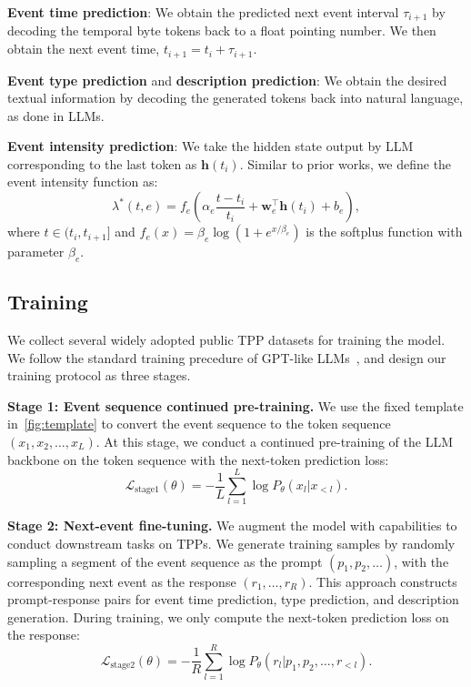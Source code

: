 \textbf{Event time prediction}: We obtain the predicted next event interval $\tau_{i+1}$ by decoding the temporal byte tokens back to a float pointing number. We then obtain the next event time, $t_{i+1} = t_i + \tau_{i+1}$. 

\textbf{Event type prediction} and \textbf{description prediction}: 
    We obtain the desired textual information by decoding the generated tokens back into natural language, as done in LLMs. 

\textbf{Event intensity prediction}: We take the hidden state output by LLM corresponding to the last token as \(\mathbf{h}(t_i)\). Similar to prior works, we define the event intensity function as: 
    \begin{equation}
        \lambda^*(t,e) = f_e(\alpha_e \frac{t-t_i}{t_i} + \mathbf{w}_e^\top \mathbf{h}(t_i) + b_e), 
    \end{equation}
    where $t \in (t_i, t_{i+1}]$ and $f_e(x)=\beta_e \log (1 + e^{x/\beta_e})$ is the softplus function with parameter $\beta_e$.


\subsection{Training}
We collect several widely adopted public TPP datasets for training the model. We follow the standard training precedure of GPT-like LLMs~\citep{openai2022}, and design our training protocol as three stages. 

\textbf{Stage 1: Event sequence continued pre-training.} We use the fixed template in~\cref{fig:template} to convert the event sequence to the token sequence $(x_1,x_2,\ldots,x_L)$.  
At this stage, we conduct a continued pre-training of the LLM backbone on the token sequence with the next-token prediction loss: 
\begin{equation}
    \mathcal{L}_{\text{stage1}}(\theta) = - \frac{1}{L} \sum_{l=1}^{L} \log P_\theta(x_l | x_{<l}). 
\end{equation}

\textbf{Stage 2: Next-event fine-tuning.} We augment the model with capabilities to conduct downstream tasks on TPPs. 
We generate training samples by randomly sampling a segment of the event sequence as the prompt \((p_1, p_2, \ldots)\), with the corresponding next event as the response \((r_1, \ldots, r_R)\). This approach constructs prompt-response pairs for event time prediction, type prediction, and description generation. 
During training, we only compute the next-token prediction loss on the response: 
\begin{equation}
    \mathcal{L}_{\text{stage2}}(\theta) = - \frac{1}{R} \sum_{l=1}^{R} \log P_\theta(r_l | p_1,p_2,\ldots, r_{<l}). 
\end{equation} 

